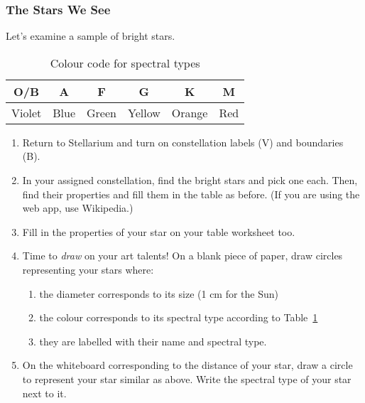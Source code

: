 \documentclass[main.tex]{subfiles}
\begin{document}
\subsubsection{The Stars We See}
Let's examine a sample of bright stars.

\begin{table}[htbp]
\caption{Colour code for spectral types}
\begin{center}
\begin{tabular}{|c|c|c|c|c|c|}\hline
O/B & A & F & G & K & M \\\hline
Violet & Blue & Green & Yellow & Orange & Red \\\hline
\end{tabular}
\end{center}
\label{tab:col}
\end{table}%

\begin{enumerate}
\item Return to Stellarium and turn on constellation labels (V) and boundaries (B).
\item In your assigned constellation, find the bright stars and pick one each. Then, find their properties and fill them in the table as before. (If you are using the web app, use Wikipedia.)
\item Fill in the properties of your star on your table worksheet too.
\item Time to \emph{draw} on your art talents! On a blank piece of paper, draw circles representing your stars where:
	\begin{enumerate}
	\item the diameter corresponds to its size (1 cm for the Sun)
	\item the colour corresponds to its spectral type according to Table~\ref{tab:col}
	\item they are labelled with their name and spectral type.
	\end{enumerate}
\item On the whiteboard corresponding to the distance of your star, draw a circle to represent your star similar as above. Write the spectral type of your star next to it.
\end{enumerate}
\end{document}
